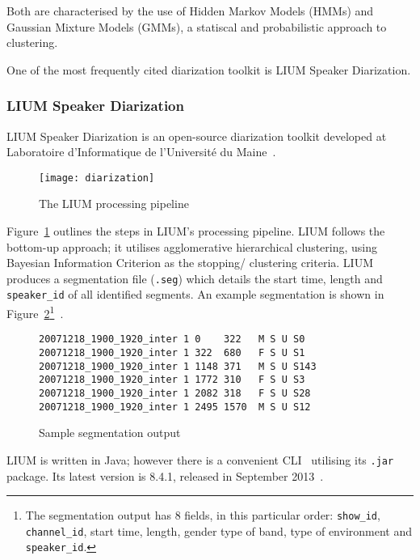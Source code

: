 Both are characterised by the use of Hidden Markov Models (HMMs) and 
Gaussian Mixture Models (GMMs), a statiscal and probabilistic approach
to clustering.

One of the most frequently cited diarization toolkit is LIUM Speaker
Diarization.

\subsubsection{LIUM Speaker Diarization}

LIUM Speaker Diarization is an open-source diarization toolkit developed
at Laboratoire d'Informatique de l'Université du Maine~\cite{lium}.

\begin{figure}[h]
\begin{center}
    \texttt{[image: diarization]}
    \caption{The LIUM processing pipeline~\cite{lium-ovr}}\label{lium}
\end{center}
\end{figure}

Figure~\ref{lium} outlines the steps in LIUM's processing pipeline.
LIUM follows the bottom-up approach; it utilises agglomerative hierarchical
clustering, using Bayesian Information Criterion as the stopping/ clustering
criteria. LIUM produces a segmentation file (\texttt{.seg}) which details
the start time, length and \texttt{speaker\_id} of all identified
segments. An example segmentation is shown in Figure~\ref{seg}\footnote{The
segmentation output has 8 fields, in this particular
order: \texttt{show\_id}, \texttt{channel\_id}, start time, length, gender
type of band, type of environment and \texttt{speaker\_id}.}~\cite{lium-seg}.

\begin{figure}[h]
\begin{lstlisting}
20071218_1900_1920_inter 1 0    322   M S U S0
20071218_1900_1920_inter 1 322  680   F S U S1
20071218_1900_1920_inter 1 1148 371   M S U S143
20071218_1900_1920_inter 1 1772 310   F S U S3
20071218_1900_1920_inter 1 2082 318   F S U S28
20071218_1900_1920_inter 1 2495 1570  M S U S12
\end{lstlisting}
\caption{Sample segmentation output}\label{seg}
\end{figure}

LIUM is written in Java; however there is a convenient CLI~\cite{lium}
utilising its \texttt{.jar} package.
Its latest version is 8.4.1, released in September 2013~\cite{lium-dl}.

